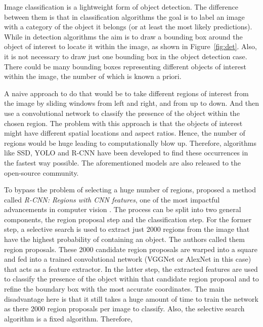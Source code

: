 \documentclass[12pt,a4paper]{report}
\newcommand{\term}{\textit}
\newcommand{\acronym}{\MakeUppercase}
\begin{document}
	Image classification is a lightweight form of object detection. The difference between 
	them is that in classification algorithms the goal is to label an image with a category 
	of the object it belongs (or at least the most likely predictions). While in detection 
	algorithms the aim is to draw a bounding box around the object of interest to locate it 
	within the image, as shown in Figure~\ref{fig:det}. Also, it is not necessary to draw 
	just one bounding box in the object detection case. There could be many bounding boxes 
	representing different objects of interest within the image, the number of which is 
	known a priori.
	\par
	A naive approach to do that would be to take different regions of interest from the 
	image by sliding windows from left and right, and from up to down. And then use a 
	convolutional network to classify the presence of the object within the chosen region. 
	The problem with this approach is that the objects of interest might have different 
	spatial locations and aspect ratios. Hence, the number of regions would be huge leading 
	to computationally blow up. Therefore, algorithms like \acronym{ssd}, \acronym{yolo} 
	and \acronym{r-cnn} \citep{Girshick, Redmon, Liu} have been developed to find these 
	occurrences in the fastest way possible. The aforementioned models are also released 
	to the open-source community.
	\par
	To bypass the problem of selecting a huge number of regions, \citet{Girshick} proposed 
	a method called \term{\acronym{r-cnn}: Regions with \acronym{cnn} features}, one of the 
	most impactful advancements in computer vision \citep{Deshpande}. The process can be 
	split into two general components, the region proposal step and the classification step. 
	For the former step, a selective search \citep{Uijlings} is used to extract just 2000 
	regions from the image that have the highest probability of containing an object. The 
	authors called them region proposals. These 2000 candidate region proposals are warped 
	into a square and fed into a trained convolutional network (VGGNet or AlexNet in this case) 
	that acts as a feature extractor. In the latter step, the extracted features are used to 
	classify the presence of the object within that candidate region proposal and to refine 
	the boundary box with the most accurate coordinates. The main disadvantage here is that 
	it still takes a huge amount of time to train the network as there 2000 region proposals 
	per image to classify. Also, the selective search algorithm is a fixed algorithm. Therefore, 
\end{document}
